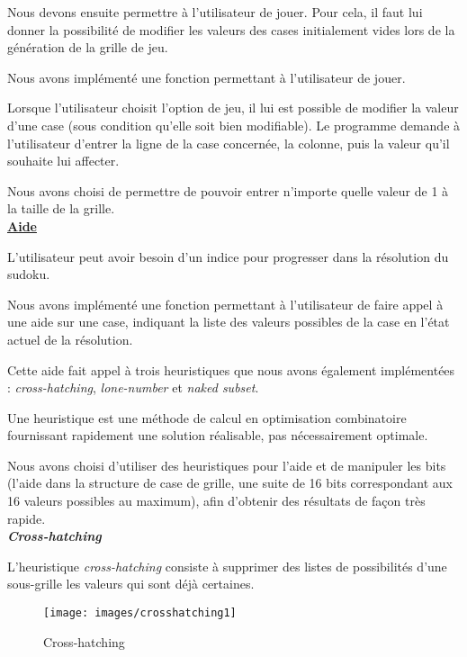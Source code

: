 \documentclass[a4paper, 12pt]{article}
\begin{document}
	\par Nous devons ensuite permettre à l'utilisateur de jouer. Pour cela, il faut lui donner la possibilité de modifier les valeurs des cases initialement vides lors de la génération de la grille de jeu.
	\par Nous avons implémenté une fonction permettant à l'utilisateur de jouer.
	\par Lorsque l'utilisateur choisit l'option de jeu, il lui est possible de modifier la valeur d'une case (sous condition qu'elle soit bien modifiable). Le programme demande à l'utilisateur d'entrer la ligne de la case concernée, la colonne, puis la valeur qu'il souhaite lui affecter.
	\par Nous avons choisi de permettre de pouvoir entrer n'importe quelle valeur de 1 à la taille de la grille.\\

\underline{\textbf{Aide}}
	
	\par L'utilisateur peut avoir besoin d'un indice pour progresser dans la résolution du sudoku.
	\par Nous avons implémenté une fonction permettant à l'utilisateur de faire appel à une aide sur une case, indiquant la liste des valeurs possibles de la case en l'état actuel de la résolution. 
	\par Cette aide fait appel à trois heuristiques que nous avons également implémentées : \textit{cross-hatching}, \textit{lone-number} et \textit{naked subset}.
	\par Une heuristique est une méthode de calcul en optimisation combinatoire fournissant rapidement une solution réalisable, pas nécessairement optimale.
	\par Nous avons choisi d'utiliser des heuristiques pour l'aide et de manipuler les bits (l'aide dans la structure de case de grille, une suite de 16 bits correspondant aux 16 valeurs possibles au maximum), afin d'obtenir des résultats de façon très rapide.\\

	\textit{\textbf{Cross-hatching}}

	\par L'heuristique \textit{cross-hatching} consiste à supprimer des listes de possibilités d'une sous-grille les valeurs qui sont déjà certaines.\\

	\begin{figure}[H]
		\caption{Cross-hatching}
		\centering
		\texttt{[image: images/crosshatching1]}
	\end{figure}
\end{document}

